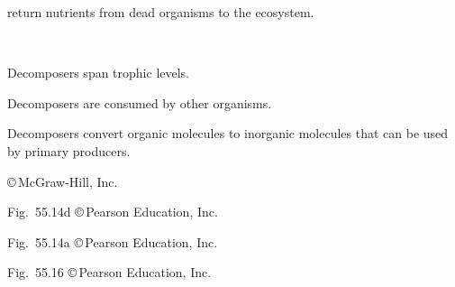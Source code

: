 \documentclass[t]{beamer}
\begin{document}
%
{
\begin{frame}[b]{ return nutrients from dead organisms to the ecosystem.}

	\hfill \tiny \textcolor{white}{TimVickers, Wikimedia, public domain}
\end{frame}
}
%

{
\begin{frame}[t]{}

	\vspace*{3\baselineskip}
	
	\hspace*{70mm}\parbox{45mm}{\raggedright Decomposers span trophic levels.}
	
	\bigskip
	
	\hspace*{70mm}\parbox{45mm}{\raggedright Decomposers are consumed by other organisms.}
		
	\bigskip
	
	\hspace*{70mm}\parbox{46mm}{\raggedright Decomposers convert organic molecules to inorganic molecules that can be used by primary producers.}

	\vfilll
	
	\hfill \tiny \copyright\,McGraw-Hill, Inc.
\end{frame}
}
%
{
\begin{frame}[b]

	\hfill \tiny Fig.~55.14d \copyright\,Pearson Education, Inc.
\end{frame}
}
%
{
\begin{frame}[b]

	\hfill \tiny Fig.~55.14a \copyright\,Pearson Education, Inc.
\end{frame}
}
%
{
\begin{frame}[b]

	\hfill \tiny Fig.~55.16 \copyright\,Pearson Education, Inc.
\end{frame}
}

\end{document}
